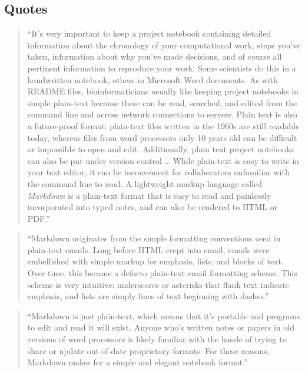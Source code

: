 \documentclass[]{tufte-book}
\begin{document}
\hypertarget{quotes}{%
\subsection{Quotes}\label{quotes}}

\begin{quote}
``It's very important to keep a project notebook containing detailed information
about the chronology of your computational work, steps you've taken, information
about why you've made decisions, and of course all pertinent information to
reproduce your work. Some scientists do this in a handwritten notebook, others in
Microsoft Word documents. As with README files, bioinformaticians usually like keeping
project notebooks in simple plain-text because these can be read, searched, and
edited from the command line and across network connections to servers. Plain text
is also a future-proof format: plain-text files written in the 1960s are still
readable today, whereas files from word processors only 10 years old can be
difficult or impossible to open and edit. Additionally, plain text project notebooks can
also be put under version control \ldots{} While plain-text is easy to write in your
text editor, it can be inconvenient for collaborators unfamiliar with the command
line to read. A lightweight markup language called \emph{Markdown} is a plain-text format
that is easy to read and painlessly incorporated into typed notes, and can also be
rendered to HTML or PDF.'' \citep{buffalo2015bioinformatics}
\end{quote}

\begin{quote}
``Markdown originates from the simple formatting conventions used in plain-text
emails. Long before HTML crept into email, emails were embellished with simple
markup for emphasis, lists, and blocks of text. Over time, this became a defacto
plain-text email formatting scheme. This scheme is very intuitive: underscores or
asterisks that flank text indicate emphasis, and lists are simply lines of text
beginning with dashes.'' \citep{buffalo2015bioinformatics}
\end{quote}

\begin{quote}
``Markdown is just plain-text, which means that it's portable and programs to edit
and read it will exist. Anyone who's written notes or papers in old versions of
word processors is likely familiar with the hassle of trying to share or update
out-of-date proprietary formats. For these reasons, Markdown makes for a simple
and elegant notebook format.'' \citep{buffalo2015bioinformatics}
\end{quote}
\end{document}
